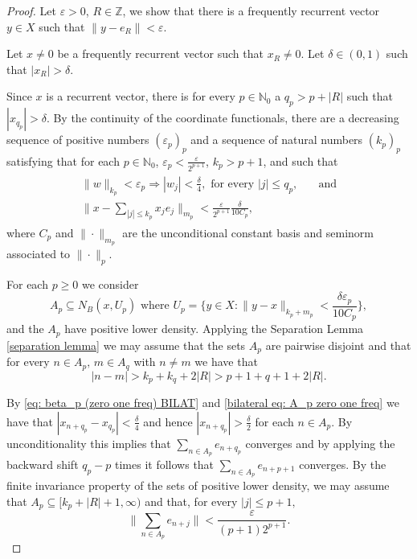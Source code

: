 \documentclass[11pt]{amsart}
\newcommand{\sub}{\subseteq}
\begin{document}
\begin{proof}
 Let $\varepsilon>0$, $R\in\mathbb Z$, we show that there is a frequently recurrent vector $y\in X$ such that $\|y-e_R\|<\varepsilon$.

Let $x\neq 0$ be a frequently recurrent vector such that $x_R\neq 0$. Let $\delta\in(0,1)$ such that $|x_R|>\delta.$

Since $x$ is a recurrent vector,  there is for every $p\in\mathbb N_0$ a  $q_p>p+|R|$ such that $|x_{q_p}|>\delta$. By the continuity of the coordinate functionals, there are a decreasing sequence of positive numbers $(\varepsilon_{p})_p$ and a sequence of natural numbers $(k_p)_p$  satisfying that for each $p\in\mathbb N_0$, $\varepsilon_{p}<\frac{\varepsilon}{2^{p+1}}$, $k_p>p+1$, and such that  
\begin{align}\label{eq: beta_p (zero one freq) BILAT}
 \begin{split}
  \|w\|_{k_p}<\varepsilon_{p}\Longrightarrow  |w_{j}|<\frac{\delta}{4} ,  \text{ for every } |j|\leq q_p, &\quad \text{and}\\
 \|x-\sum_{|j|\le k_p} x_j e_j\|_{m_p}<\frac{\varepsilon}{2^{p+1}}\frac{\delta}{10C_p},&
 \end{split}
 \end{align}
 where $C_p$ and $\|\cdot\|_{m_p}$ are the unconditional constant basis and seminorm associated to $\|\cdot\|_p$. 



 
 

For each $p\ge 0$ we consider 
\begin{equation}\label{bilateral eq: A_p zero one freq}
A_p\subseteq N_B(x,U_p) \text{ where } U_p=\{y\in X:\|y-x\|_{k_p+m_p}<\frac{\delta\varepsilon_p}{10C_p}\},
\end{equation}
and the $A_p$ have positive lower density.
Applying the Separation Lemma \ref{separation lemma}
we may assume that the sets $A_p$ are pairwise disjoint and that for every $n\in A_p,\, m\in A_q$ with $n\neq m$ we have that
\begin{equation}\label{bilateral eq separation zero one freq}
|n-m|>k_p+k_q+2|R|>p+1+q+1+2|R|.    
\end{equation}

 By \eqref{eq: beta_p (zero one freq) BILAT} and \eqref{bilateral eq: A_p zero one freq} we have that $|x_{n+q_p}-x_{q_p}|<\frac{\delta}{4}$ and hence $|x_{n+q_p}|>\frac{\delta}{2}$ for each $n\in A_p.$ By unconditionality this implies that $\sum_{n\in A_p} e_{n+q_p}$ converges and by applying the backward shift $q_p-p$ times it follows that $\sum_{n\in A_p} e_{n+p+1}$ converges. By the finite invariance property of  the sets of positive lower density, we may assume that $A_p\sub [k_p+|R|+1,\infty)$ and that,  for every $|j|\le p+1,$
\begin{equation}\label{bilateral eq: sumas de e_j norma chica (zero one freq)}
 \|\sum_{n\in A_p} e_{n+j}\|<\frac{\varepsilon}{(p+1)2^{p+1}}.   
\end{equation}


\end{proof}
\end{document}
